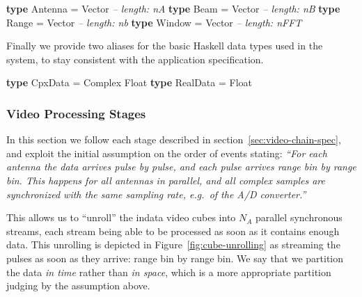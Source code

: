 \documentclass[
  a4paper,
]{article}
\newenvironment{Shaded}{}{}
\newcommand{\CommentTok}[1]{\textcolor[rgb]{0.38,0.63,0.69}{\textit{#1}}}
\newcommand{\DataTypeTok}[1]{\textcolor[rgb]{0.56,0.13,0.00}{#1}}
\newcommand{\FunctionTok}[1]{\textcolor[rgb]{0.02,0.16,0.49}{#1}}
\newcommand{\KeywordTok}[1]{\textcolor[rgb]{0.00,0.44,0.13}{\textbf{#1}}}
\begin{document}
\begin{Shaded}
\begin{Highlighting}[numbers=left,,firstnumber=107,]
\KeywordTok{type} \DataTypeTok{Antenna}     \FunctionTok{=} \DataTypeTok{Vector} \CommentTok{-- length: nA}
\KeywordTok{type} \DataTypeTok{Beam}        \FunctionTok{=} \DataTypeTok{Vector} \CommentTok{-- length: nB}
\KeywordTok{type} \DataTypeTok{Range}       \FunctionTok{=} \DataTypeTok{Vector} \CommentTok{-- length: nb}
\KeywordTok{type} \DataTypeTok{Window}      \FunctionTok{=} \DataTypeTok{Vector} \CommentTok{-- length: nFFT}
\end{Highlighting}
\end{Shaded}

Finally we provide two aliases for the basic Haskell data types used in
the system, to stay consistent with the application specification.

\begin{Shaded}
\begin{Highlighting}[numbers=left,,firstnumber=115,]
\KeywordTok{type} \DataTypeTok{CpxData}  \FunctionTok{=} \DataTypeTok{Complex} \DataTypeTok{Float}
\KeywordTok{type} \DataTypeTok{RealData} \FunctionTok{=} \DataTypeTok{Float}
\end{Highlighting}
\end{Shaded}

\hypertarget{video-processing-stages}{%
\subsubsection{Video Processing Stages}\label{video-processing-stages}}

In this section we follow each stage described in
section~\ref{sec:video-chain-spec}, and exploit the initial assumption
on the order of events stating: \emph{``For each antenna the data
arrives \emph{pulse by pulse}, and each pulse arrives \emph{range bin by
range bin}. This happens \emph{for all antennas in parallel}, and all
complex samples are synchronized with the same sampling rate, e.g.~of
the A/D converter.''}

This allows us to ``unroll'' the indata video cubes into \(N_A\)
parallel synchronous streams, each stream being able to be processed as
soon as it contains enough data. This unrolling is depicted in
Figure~\ref{fig:cube-unrolling} as streaming the pulses as soon as they
arrive: range bin by range bin. We say that we partition the data
\emph{in time} rather than \emph{in space}, which is a more appropriate
partition judging by the assumption above.
\end{document}
